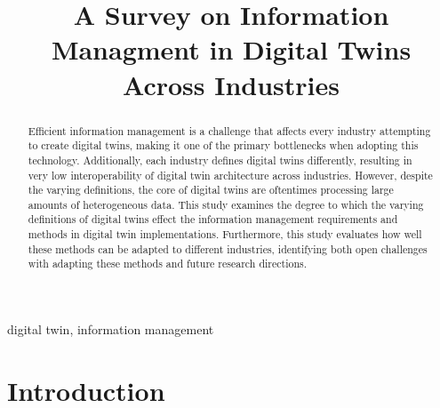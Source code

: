 \documentclass[conference]{IEEEtran}
\begin{document}
\title{A Survey on Information Managment in Digital Twins Across Industries}
\author{
}

\maketitle

\begin{abstract}
    Efficient information management is a challenge that affects every industry attempting to create digital twins, making it one of the primary bottlenecks when adopting this technology. Additionally, each industry defines digital twins differently, resulting in very low interoperability of digital twin architecture across industries. However, despite the varying definitions, the core of digital twins are oftentimes processing large amounts of heterogeneous data. This study examines the degree to which the varying definitions of digital twins effect the information management requirements and methods in digital twin implementations. Furthermore, this study evaluates how well these methods can be adapted to different industries, identifying both open challenges with adapting these methods and future research directions.
\end{abstract}

\begin{IEEEkeywords}
    digital twin, information management
\end{IEEEkeywords}

\section{Introduction}
\end{document}
